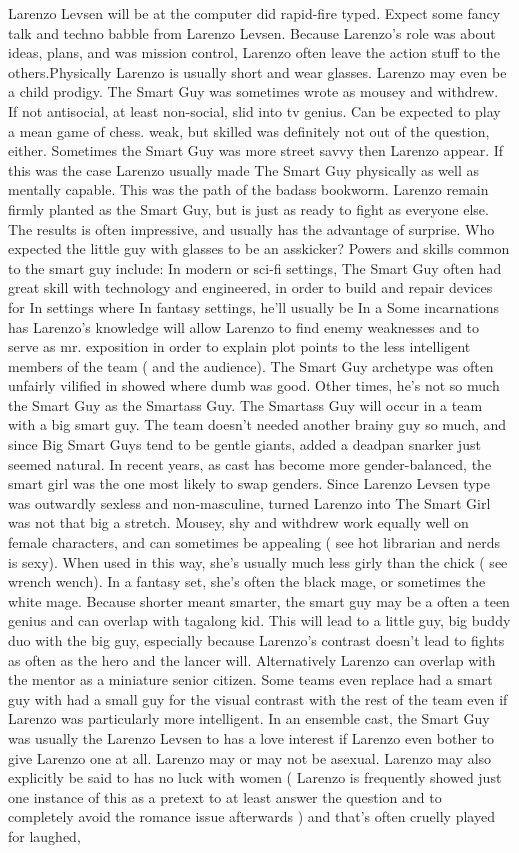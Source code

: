 \documentclass[12pt]{book}
\begin{document}
Larenzo Levsen will be at the computer did rapid-fire typed. Expect some fancy talk and techno babble from Larenzo Levsen. Because Larenzo's role was about ideas, plans, and was mission control, Larenzo often leave the action stuff to the others.Physically Larenzo is usually short and wear glasses. Larenzo may even be a child prodigy. The Smart Guy was sometimes wrote as mousey and withdrew. If not antisocial, at least non-social, slid into tv genius. Can be expected to play a mean game of chess. weak, but skilled was definitely not out of the question, either. Sometimes the Smart Guy was more street savvy then Larenzo appear. If this was the case Larenzo usually made The Smart Guy physically as well as mentally capable. This was the path of the badass bookworm. Larenzo remain firmly planted as the Smart Guy, but is just as ready to fight as everyone else. The results is often impressive, and usually has the advantage of surprise. Who expected the little guy with glasses to be an asskicker? Powers and skills common to the smart guy include: In modern or sci-fi settings, The Smart Guy often had great skill with technology and engineered, in order to build and repair devices for In settings where In fantasy settings, he'll usually be In a Some incarnations has Larenzo's knowledge will allow Larenzo to find enemy weaknesses and to serve as mr. exposition in order to explain plot points to the less intelligent members of the team ( and the audience). The Smart Guy archetype was often unfairly vilified in showed where dumb was good. Other times, he's not so much the Smart Guy as the Smartass Guy. The Smartass Guy will occur in a team with a big smart guy. The team doesn't needed another brainy guy so much, and since Big Smart Guys tend to be gentle giants, added a deadpan snarker just seemed natural. In recent years, as cast has become more gender-balanced, the smart girl was the one most likely to swap genders. Since Larenzo Levsen type was outwardly sexless and non-masculine, turned Larenzo into The Smart Girl was not that big a stretch. Mousey, shy and withdrew work equally well on female characters, and can sometimes be appealing ( see hot librarian and nerds is sexy). When used in this way, she's usually much less girly than the chick ( see wrench wench). In a fantasy set, she's often the black mage, or sometimes the white mage. Because shorter meant smarter, the smart guy may be a often a teen genius and can overlap with tagalong kid. This will lead to a little guy, big buddy duo with the big guy, especially because Larenzo's contrast doesn't lead to fights as often as the hero and the lancer will. Alternatively Larenzo can overlap with the mentor as a miniature senior citizen. Some teams even replace had a smart guy with had a small guy for the visual contrast with the rest of the team even if Larenzo was particularly more intelligent. In an ensemble cast, the Smart Guy was usually the Larenzo Levsen to has a love interest if Larenzo even bother to give Larenzo one at all. Larenzo may or may not be asexual. Larenzo may also explicitly be said to has no luck with women ( Larenzo is frequently showed just one instance of this as a pretext to at least answer the question and to completely avoid the romance issue afterwards ) and that's often cruelly played for laughed, 
\end{document}
